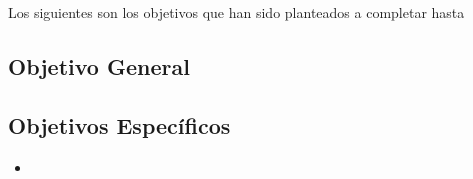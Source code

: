 Los siguientes son los objetivos que han sido planteados a completar hasta

\subsection*{Objetivo General}

\subsection*{Objetivos Específicos}
\begin{itemize}
    \item
\end{itemize}

